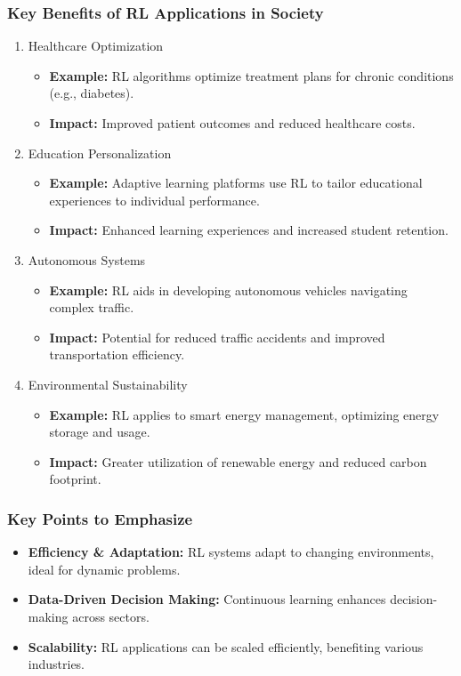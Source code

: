 \documentclass[aspectratio=169]{beamer}
\begin{document}
\begin{frame}[fragile]
    \frametitle{Key Benefits of RL Applications in Society}
    \begin{enumerate}
        \item \alert{Healthcare Optimization}
            \begin{itemize}
                \item \textbf{Example:} RL algorithms optimize treatment plans for chronic conditions (e.g., diabetes).
                \item \textbf{Impact:} Improved patient outcomes and reduced healthcare costs.
            \end{itemize}

        \item \alert{Education Personalization}
            \begin{itemize}
                \item \textbf{Example:} Adaptive learning platforms use RL to tailor educational experiences to individual performance.
                \item \textbf{Impact:} Enhanced learning experiences and increased student retention.
            \end{itemize}

        \item \alert{Autonomous Systems}
            \begin{itemize}
                \item \textbf{Example:} RL aids in developing autonomous vehicles navigating complex traffic.
                \item \textbf{Impact:} Potential for reduced traffic accidents and improved transportation efficiency.
            \end{itemize}

        \item \alert{Environmental Sustainability}
            \begin{itemize}
                \item \textbf{Example:} RL applies to smart energy management, optimizing energy storage and usage.
                \item \textbf{Impact:} Greater utilization of renewable energy and reduced carbon footprint.
            \end{itemize}
    \end{enumerate}
\end{frame}

\begin{frame}[fragile]
    \frametitle{Key Points to Emphasize}
    \begin{itemize}
        \item \textbf{Efficiency \& Adaptation:} RL systems adapt to changing environments, ideal for dynamic problems.
        \item \textbf{Data-Driven Decision Making:} Continuous learning enhances decision-making across sectors.
        \item \textbf{Scalability:} RL applications can be scaled efficiently, benefiting various industries.
    \end{itemize}
\end{frame}
\end{document}

